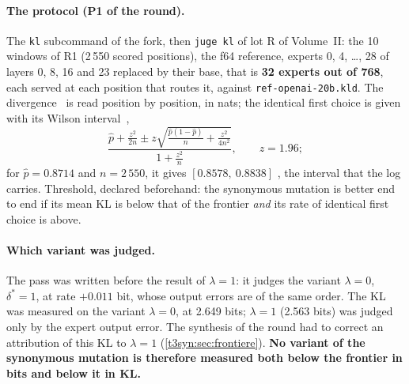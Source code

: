 \paragraph{The protocol (P1 of the round).} The \texttt{kl} subcommand of the fork, then \texttt{juge kl} of lot R of Volume~II: the 10 windows of R1 (2\,550 scored positions), the f64 reference, experts 0, 4, \ldots, 28 of layers 0, 8, 16 and 23 replaced by their base, that is \textbf{32 experts out of 768}, each served at each position that routes it, against \texttt{ref-openai-20b.kld}. The divergence~\cite{kullback1951} is read position by position, in nats; the identical first choice is given with its Wilson interval~\cite{wilson1927},
\begin{equation}\label{t3ecl:eq:wilson}
\frac{\hat p + \frac{z^2}{2n} \pm z\sqrt{\frac{\hat p (1-\hat p)}{n} + \frac{z^2}{4n^2}}}{1 + \frac{z^2}{n}}, \qquad z = 1.96 ;
\end{equation}
for $\hat p = 0.8714$ and $n = 2\,550$, it gives $[0.8578,\ 0.8838]$ \calc, the interval that the log carries. Threshold, declared beforehand: the synonymous mutation is better end to end if its mean KL is below that of the frontier \emph{and} its rate of identical first choice is above.

\paragraph{Which variant was judged.} The pass was written before the result of $\lambda = 1$: it judges the variant $\lambda = 0$, $\delta^\ast = 1$, at rate $+0.011$ bit, whose output errors are of the same order. The KL was measured on the variant $\lambda = 0$, at 2.649 bits; $\lambda = 1$ (2.563 bits) was judged only by the expert output error. The synthesis of the round had to correct an attribution of this KL to $\lambda = 1$ (\cref{t3syn:sec:frontiere}). \textbf{No variant of the synonymous mutation is therefore measured both below the frontier in bits and below it in KL.}

